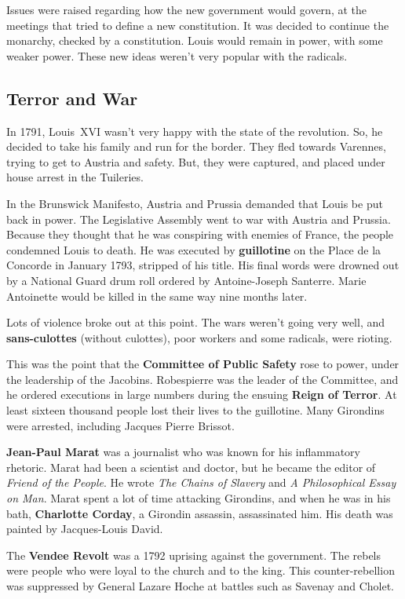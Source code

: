 Issues were raised regarding how the new government would govern,
at the meetings that tried to define a new constitution.
It was decided to continue the monarchy, checked by a constitution.
Louis would remain in power, with some weaker power.
These new ideas weren't very popular with the radicals.

\subsection*{Terror and War}

In 1791, Louis~XVI wasn't very happy with the state of the revolution.
So, he decided to take his family and run for the border.
They fled towards Varennes, trying to get to Austria and safety.
But, they were captured, and placed under house arrest in the Tuileries.

In the Brunswick Manifesto, Austria and Prussia demanded that Louis be put back in power.
The Legislative Assembly went to war with Austria and Prussia.
Because they thought that he was conspiring with enemies of France, the people condemned Louis to death.
He was executed by \textbf{guillotine} on the Place de la Concorde in January 1793, stripped of his title.
His final words were drowned out by a National Guard drum roll ordered by Antoine-Joseph Santerre.
Marie Antoinette would be killed in the same way nine months later.

Lots of violence broke out at this point.
The wars weren't going very well, and \textbf{sans-culottes} (without culottes),
poor workers and some radicals, were rioting.

This was the point that the \textbf{Committee of Public Safety} rose to power,
under the leadership of the Jacobins.
Robespierre was the leader of the Committee,
and he ordered executions in large numbers during the ensuing \textbf{Reign of Terror}.
At least sixteen thousand people lost their lives to the guillotine.
Many Girondins were arrested, including Jacques Pierre Brissot.

\textbf{Jean-Paul Marat} was a journalist who was known for his inflammatory rhetoric.
Marat had been a scientist and doctor, but he became the editor of \textit{Friend of the People}.
He wrote \textit{The Chains of Slavery} and \textit{A Philosophical Essay on Man}.
Marat spent a lot of time attacking Girondins, and when he was in his bath,
\textbf{Charlotte Corday}, a Girondin assassin, assassinated him.
His death was painted by Jacques-Louis David.

The \textbf{Vendee Revolt} was a 1792 uprising against the government.
The rebels were people who were loyal to the church and to the king.
This counter-rebellion was suppressed by General Lazare Hoche at battles such as Savenay and Cholet.

